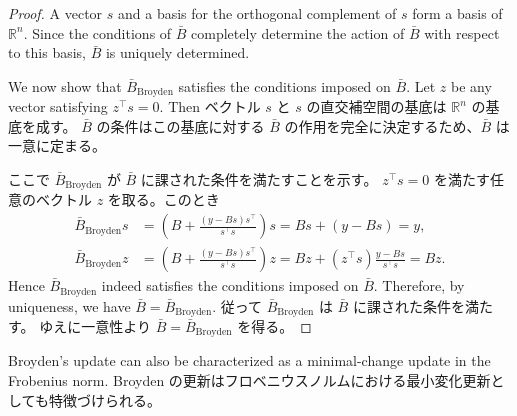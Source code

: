 \documentclass[0_main]{subfiles}
\begin{document}
\begin{proof}
    \ifEn
        A vector $s$ and a basis for the orthogonal complement of $s$ form a basis of $\mathbb{R}^n$.
        Since the conditions of $\bar{B}$ completely determine the action of $\bar{B}$ with respect to this basis, $\bar{B}$ is uniquely determined.

        We now show that $\bar{B}_{\mathrm{Broyden}}$ satisfies the conditions imposed on $\bar{B}$.
        Let $z$ be any vector satisfying $z^\top s = 0$. Then
    \else
        ベクトル $s$ と $s$ の直交補空間の基底は $\mathbb{R}^n$ の基底を成す。
        $\bar{B}$ の条件はこの基底に対する $\bar{B}$ の作用を完全に決定するため、$\bar{B}$ は一意に定まる。

        ここで $\bar{B}_{\mathrm{Broyden}}$ が $\bar{B}$ に課された条件を満たすことを示す。
        $z^\top s = 0$ を満たす任意のベクトル $z$ を取る。このとき
    \fi
    \begin{align*}
        \bar{B}_{\mathrm{Broyden}} s
         & = \left(B + \frac{(y - Bs)s^\top}{s^\top s}\right) s
        = Bs + (y - Bs)
        = y,                                                    \\
        \bar{B}_{\mathrm{Broyden}} z
         & = \left(B + \frac{(y - Bs)s^\top}{s^\top s}\right) z
        = Bz + (z^\top s) \frac{y - Bs}{s^\top s}
        = Bz.
    \end{align*}
    \ifEn
        Hence $\bar{B}_{\mathrm{Broyden}}$ indeed satisfies the conditions imposed on $\bar{B}$.
        Therefore, by uniqueness, we have $\bar{B} = \bar{B}_{\mathrm{Broyden}}$.
    \else
        従って $\bar{B}_{\mathrm{Broyden}}$ は $\bar{B}$ に課された条件を満たす。
        ゆえに一意性より $\bar{B} = \bar{B}_{\mathrm{Broyden}}$ を得る。
    \fi
    \myQED
\end{proof}

\ifEn
    Broyden's update can also be characterized as a minimal-change update in the Frobenius norm.
\else
    Broyden の更新はフロベニウスノルムにおける最小変化更新としても特徴づけられる。
\fi
\end{document}
